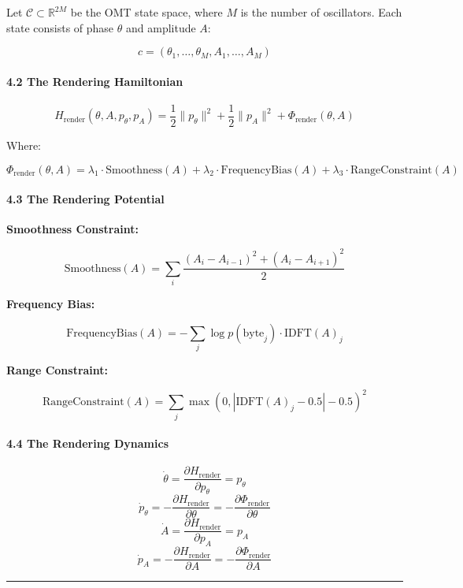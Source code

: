 \documentclass[
  11pt,
  a4paper,
]{article}
\begin{document}
Let \(\mathcal{C} \subset \mathbb{R}^{2M}\) be the OMT state space,
where \(M\) is the number of oscillators. Each state consists of phase
\(\theta\) and amplitude \(A\):

\[
c = (\theta_1, \dots, \theta_M, A_1, \dots, A_M)
\]

\paragraph{4.2 The Rendering
Hamiltonian}\label{the-rendering-hamiltonian-1}

\[
H_{\text{render}}(\theta, A, p_\theta, p_A) = \frac{1}{2} \|p_\theta\|^2 + \frac{1}{2} \|p_A\|^2 + \Phi_{\text{render}}(\theta, A)
\]

Where:

\[
\Phi_{\text{render}}(\theta, A) = \lambda_1 \cdot \text{Smoothness}(A) + \lambda_2 \cdot \text{FrequencyBias}(A) + \lambda_3 \cdot \text{RangeConstraint}(A)
\]

\paragraph{4.3 The Rendering Potential}\label{the-rendering-potential-1}

\textbf{Smoothness Constraint:}

\[
\text{Smoothness}(A) = \sum_i \frac{(A_i - A_{i-1})^2 + (A_i - A_{i+1})^2}{2}
\]

\textbf{Frequency Bias:}

\[
\text{FrequencyBias}(A) = -\sum_j \log p(\text{byte}_j) \cdot \text{IDFT}(A)_j
\]

\textbf{Range Constraint:}

\[
\text{RangeConstraint}(A) = \sum_j \max(0, |\text{IDFT}(A)_j - 0.5| - 0.5)^2
\]

\paragraph{4.4 The Rendering Dynamics}\label{the-rendering-dynamics}

\[
\dot{\theta} = \frac{\partial H_{\text{render}}}{\partial p_\theta} = p_\theta
\] \[
\dot{p}_\theta = -\frac{\partial H_{\text{render}}}{\partial \theta} = -\frac{\partial \Phi_{\text{render}}}{\partial \theta}
\] \[
\dot{A} = \frac{\partial H_{\text{render}}}{\partial p_A} = p_A
\] \[
\dot{p}_A = -\frac{\partial H_{\text{render}}}{\partial A} = -\frac{\partial \Phi_{\text{render}}}{\partial A}
\]

\begin{center}\rule{0.5\linewidth}{0.5pt}\end{center}
\end{document}
